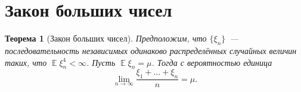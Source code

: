 \documentclass[12pt]{article}
\DeclareMathOperator{\mexp}{\mathbb{E}}
\newtheorem*{theorem*}{Теорема}
\begin{document}
    \section{Закон больших чисел}
    \begin{theorem*}[Закон больших чисел]
        Предположим, что $\{\xi_n\}$~--- последовательность независимых одинаково распределённых случайных величин таких, что $\mexp \xi_n^4 < \infty$. Пусть $\mexp \xi_n = \mu$. Тогда с вероятностью единица
        \begin{equation*}
            \lim_{n \to \infty} \frac{\xi_1 + \ldots + \xi_n}{n} = \mu.
        \end{equation*}
    \end{theorem*}

    
\end{document}
